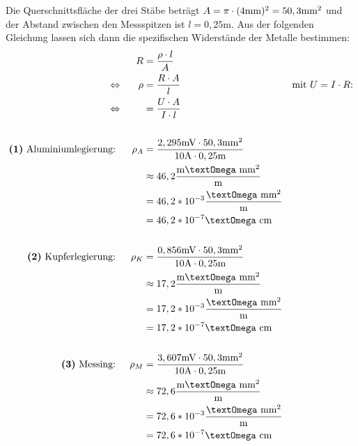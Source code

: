 \documentclass[]{article}
\newcommand{\eq}{\Leftrightarrow}
\newcommand{\unit}[1]{\text{#1}}
\newcommand{\fracunit}[2]{\frac{\unit{#1}}{\unit{#2}}}
\newcommand{\textsq}[1]{\ensuremath{\text{#1}^2}}
\begin{document}
	Die Querschnittsfläche der drei Stäbe beträgt $A = \pi \cdot (4\unit{mm})^2 = 50,3\unit{\textsq{mm}}$ und der Abstand zwischen den Messspitzen ist $l = 0,25\unit{m}$. Aus der folgenden Gleichung lassen sich dann die spezifischen Widerstände der Metalle bestimmen:
	\begin{align*}
		&&R &= \frac{\rho \cdot l}{A} &&\\
		\eq&& \rho &= \frac{R \cdot A}{l} &\text{mit }U &= I \cdot R\text{:}\\
		\eq&& &= \frac{U \cdot A}{I \cdot l} &&\\
		\\%
		\text{\textbf{(1)} Aluminiumlegierung: }&& \rho_A &= \frac{2,295\unit{mV} \cdot 50,3\unit{\textsq{mm}}}{10\unit{A} \cdot 0,25\unit{m}} &&\\
		&& &\approx 46,2\fracunit{m\textOmega \textsq{mm}}{m} &&\\
		&& &= 46,2 * 10^{-3}\fracunit{\textOmega \textsq{mm}}{m}&&\\
		&& &= 46,2 * 10^{-7}\unit{\textOmega cm}&&\\
		\\%
		\text{\textbf{(2)} Kupferlegierung: }&& \rho_K &= \frac{0,856\unit{mV} \cdot 50,3\unit{\textsq{mm}}}{10\unit{A} \cdot 0,25\unit{m}} &&\\
		&& &\approx 17,2\fracunit{m\textOmega \textsq{mm}}{m} &&\\
		&& &= 17,2 * 10^{-3}\fracunit{\textOmega \textsq{mm}}{m}&&\\
		&& &= 17,2 * 10^{-7}\unit{\textOmega cm}&&\\
		\\%
		\text{\textbf{(3)} Messing: }&& \rho_M &= \frac{3,607\unit{mV} \cdot 50,3\unit{\textsq{mm}}}{10\unit{A} \cdot 0,25\unit{m}} &&\\
		&& &\approx 72,6\fracunit{m\textOmega \textsq{mm}}{m} &&\\
		&& &= 72,6 * 10^{-3}\fracunit{\textOmega \textsq{mm}}{m}&&\\
		&& &= 72,6 * 10^{-7}\unit{\textOmega cm}&&\\
	\end{align*}





\end{document}
